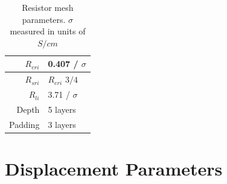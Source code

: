 \documentclass[journal, a4paper]{IEEEtran}
\begin{document}
\begin{table}
    \begin{center}
        \begin{tabular}{|r|l|}
            \hline
            $R_{eri}$ & 0.407 / $\sigma$ \\ \hline
            $R_{sri}$ & $R_{eri}$ $3/4$ \\ \hline
            $R_{li}$ & 3.71 / $\sigma$ \\ \hline
            Depth & 5 layers \\ \hline
            Padding & 3 layers \\ \hline
        \end{tabular}
    \end{center}
    \caption{Resistor mesh parameters. $\sigma$ measured in units of $S/cm$}
    \label{tab:RESparams}
\end{table}





\section{Displacement Parameters}
\end{document}
